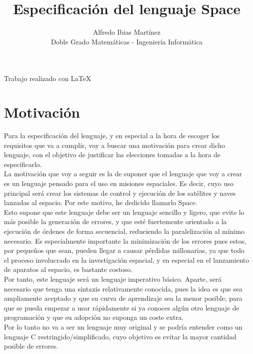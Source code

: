 \documentclass[a4paper, 12pt]{article}
\begin{document}
\title{\Huge \bf Especificación del lenguaje Space}
\author{
	\small Alfredo Ibias Martínez\\
    \small Doble Grado Matemáticas - Ingeniería Informática
    }
\date{}
\maketitle

\vfill
\begin{center}
{\footnotesize Trabajo realizado con \LaTeX}
\end{center}
\newpage

\begin{center}
\tableofcontents
\end{center}
\newpage

\section{Motivación}
Para la especificación del lenguaje, y en especial a la hora de escoger los requisitos que va a cumplir, voy a buscar una motivación para crear dicho lenguaje, con el objetivo de justificar las elecciones tomadas a la hora de especificarlo.\\

La motivación que voy a seguir es la de suponer que el lenguaje que voy a crear es un lenguaje pensado para el uso en misiones espaciales. Es decir, cuyo uso principal será crear los sistemas de control y ejecución de los satélites y naves lanzadas al espacio. Por este motivo, he dedicido llamarlo Space.\\

Esto supone que este lenguaje debe ser un lenguaje sencillo y ligero, que evite lo más posible la generación de errores, y que esté fuertemente orientado a la ejecución de órdenes de forma secuencial, reduciendo la paralelización al mínimo necesario. Es especialmente importante la minimización de los errores pues estos, por pequeños que sean, pueden llegar a causar pérdidas millonarias, ya que todo el proceso involucrado en la investigación espacial, y en especial en el lanzamiento de aparatos al espacio, es bastante costoso.\\

Por tanto, este lenguaje será un lenguaje imperativo básico. Aparte, será necesario que tenga una sintaxis relativamente conocida, pues la idea es que sea ampliamente aceptado y que su curva de aprendizaje sea la menor posible, para que se pueda empezar a usar rápidamente si ya conoces algún otro lenguaje de programación y que su adopción no suponga un coste extra.\\
Por lo tanto no va a ser un lenguaje muy original y se podría entender como un lenguaje C restringido/simplificado, cuyo objetivo es evitar la mayor cantidad posible de errores.\\
\end{document}

